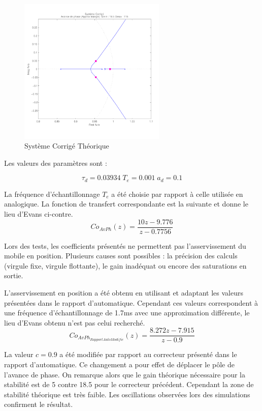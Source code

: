 \documentclass[11pt, french]{article} %
\begin{document}
\begin{figure}

	\includegraphics[width = 7cm,trim=0 1.4cm 0 0.7cm ,clip=true]
					{SolutionNumerique/SystemeCorrigeThorique.pdf}
	\caption{Système Corrigé Théorique}
	\vspace{1cm}
\end{figure}
Les valeurs des paramètres sont :

\[\tau_d=0.03934 \; T_e=0.001 \; a_d=0.1\]

La fréquence d'échantillonnage $T_e$ a été choisie par rapport à celle utilisée en analogique. La fonction de transfert correspondante est la suivante et donne le lieu d'Evans ci-contre.
\[Co_{AvPh}(z)=\dfrac{10 z - 9.776}{z -0.7756}\]

Lors des tests, les coefficients présentés ne permettent pas l'asservissement du mobile en position. Plusieurs causes sont possibles : la précision des calculs (virgule fixe, virgule flottante), le gain inadéquat ou encore des saturations en sortie.

L'asservissement en position a été obtenu en utilisant et adaptant les valeurs présentées dans le rapport d'automatique. Cependant ces valeurs correspondent à une fréquence d'échantillonnage de 1.7ms avec une approximation différente, le lieu d'Evans obtenu n'est pas celui recherché.
\[  Co_{AvPh_{Rapport Auto Modifie}}(z) = \dfrac {8.272z - 7.915} {z - 0.9} \]

La valeur $c=0.9$ a été modifiée par rapport au correcteur présenté dans le rapport d'automatique. Ce changement a pour effet de déplacer le pôle de l'avance de phase. On remarque alors que le gain théorique nécessaire pour la stabilité est de 5 contre 18.5 pour le correcteur précédent. Cependant la zone de stabilité théorique est très faible. Les oscillations observées lors des simulations confirment le résultat.
\end{document}
